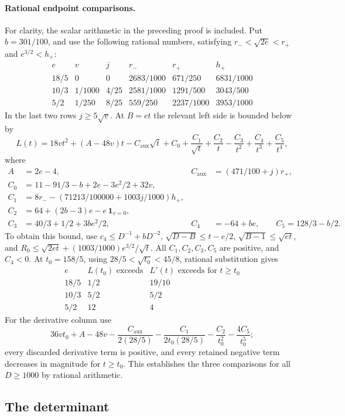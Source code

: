 \paragraph{Rational endpoint comparisons.}
For clarity, the scalar arithmetic in the preceding proof is included.
Put $b=301/100$, and use the following rational numbers, satisfying
$r_-<\sqrt{2e}<r_+$ and $e^{3/2}<h_+$:
\[
\begin{array}{c|c|c|c|c|c}
 e&v&j&r_-&r_+&h_+\\\hline
 18/5&0&0&2683/1000&671/250&6831/1000\\
 10/3&1/1000&4/25&2581/1000&1291/500&3043/500\\
 5/2&1/250&8/25&559/250&2237/1000&3953/1000
\end{array}
\]
In the last two rows $j\ge5\sqrt v$. At $B=et$ the relevant left side
is bounded below by
\[
 L(t)=18vt^2+(A-48v)t-C_{\mathrm{aux}}\sqrt t+C_0+\frac{C_1}{\sqrt t}
              +\frac{C_2}{t}-\frac{C_3}{t^2}+\frac{C_4}{t^3}
              +\frac{C_5}{t^4},
\]
where
\begin{align*}
 A&=2e-4,& C_{\mathrm{aux}}&=(471/100+j)r_+,\\
 C_0&=11-91/3-b+2e-3e^2/2+32v,\\
 C_1&=8r_--(71213/100000+1003j/1000)h_+,\\
 C_2&=64+(2b-3)e-e\,\mathbf1_{v=0},\\
 C_3&=40/3+1/2+3be^2/2,& C_4&=-64+be,\qquad C_5=128/3-b/2.
\end{align*}
To obtain this bound, use $c_4\le D^{-1}+bD^{-2}$,
$\sqrt{D-B}\le t-e/2$, $\sqrt{B-1}\le\sqrt{et}$, and
$R_0\le\sqrt{2et}+(1003/1000)e^{3/2}/\sqrt t$.
All $C_1,C_2,C_3,C_5$ are positive, and $C_4<0$.
At $t_0=158/5$, using $28/5<\sqrt{t_0}<45/8$, rational substitution gives
\[
\begin{array}{c|c|c}
 e& L(t_0)\text{ exceeds}&L'(t)\text{ exceeds for }t\ge t_0\\\hline
 18/5&1/2&19/10\\
 10/3&5/2&5/2\\
 5/2&12&4
\end{array}
\]
For the derivative column use
\[
 36vt_0+A-48v-\frac{C_{\mathrm{aux}}}{2(28/5)}
 -\frac{C_1}{2t_0(28/5)}-\frac{C_2}{t_0^2}-\frac{4C_5}{t_0^5};
\]
every discarded derivative term is positive, and every retained negative
term decreases in magnitude for $t\ge t_0$. This establishes the three
comparisons for all $D\ge1000$ by rational arithmetic.


\subsection{The determinant}

